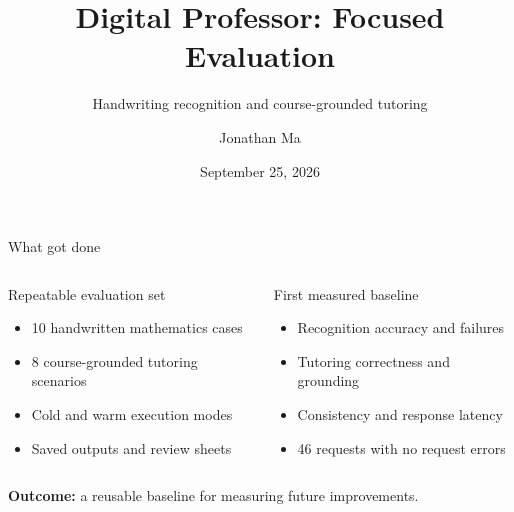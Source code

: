 \documentclass[aspectratio=169,10pt]{beamer}
\title{Digital Professor: Focused Evaluation}
\subtitle{Handwriting recognition and course-grounded tutoring}
\author{Jonathan Ma}
\date{September 25, 2026}
\newcommand{\good}[1]{\textcolor{Forest}{\textbf{#1}}}
\begin{document}
\begin{frame}[plain]
\vfill
{\color{Forest}\LARGE\inserttitle\par}
\vspace{.5em}{\color{Muted}\large\insertsubtitle\par}
\vspace{1.5em}{\color{Rust}\rule{2.2cm}{2pt}}\par
\vspace{1.2em}{\small\insertauthor\hfill\insertdate}
\vfill
\end{frame}

\begin{frame}{What got done}
\begin{columns}[T,onlytextwidth]
\begin{block}{Repeatable evaluation set}
\begin{itemize}
\item 10 handwritten mathematics cases
\item 8 course-grounded tutoring scenarios
\item Cold and warm execution modes
\item Saved outputs and review sheets
\end{itemize}
\end{block}
\begin{block}{First measured baseline}
\begin{itemize}
\item Recognition accuracy and failures
\item Tutoring correctness and grounding
\item Consistency and response latency
\item 46 requests with no request errors
\end{itemize}
\end{block}
\end{columns}
\vspace{.5em}
\centering\good{Outcome:} a reusable baseline for measuring future improvements.
\end{frame}
\end{document}
